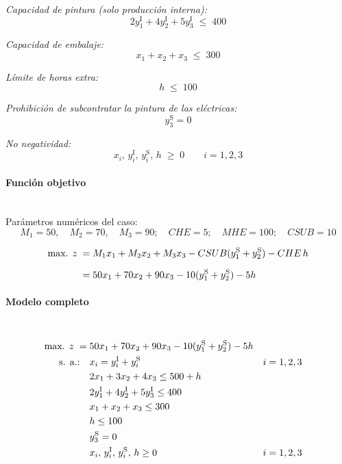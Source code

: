 \textit{Capacidad de pintura (solo producción interna):}
\begin{equation}
2y_1^{\mathrm{I}} + 4y_2^{\mathrm{I}} + 5y_3^{\mathrm{I}} \;\leq\; 400
\end{equation}

\textit{Capacidad de embalaje:}
\begin{equation}
x_1 + x_2 + x_3 \;\leq\; 300
\end{equation}

\textit{Límite de horas extra:}
\begin{equation}
h \;\leq\; 100
\end{equation}

\textit{Prohibición de subcontratar la pintura de las eléctricas:}
\begin{equation}
y_3^{\mathrm{S}} = 0
\end{equation}

\textit{No negatividad:}
\begin{equation}
x_i,\, y_i^{\mathrm{I}},\, y_i^{\mathrm{S}},\, h \;\geq\; 0 \qquad i=1,2,3
\end{equation}


\paragraph{Función objetivo}\mbox{}\\[-1mm]

Parámetros numéricos del caso:
\[
M_1 = 50,\quad M_2 = 70,\quad M_3 = 90;\quad
CHE = 5;\quad MHE = 100;\quad CSUB = 10
\]

\begin{align}
\mbox{max. } z \;=\;& 
M_1x_1 + M_2x_2 + M_3x_3 
- CSUB(y_1^{\mathrm{S}} + y_2^{\mathrm{S}})
- CHE\,h \notag\\[2mm]
=\;& 
50x_1 + 70x_2 + 90x_3 
- 10(y_1^{\mathrm{S}} + y_2^{\mathrm{S}}) 
- 5h
\end{align}


\paragraph{Modelo completo}\mbox{}\\[-1mm]

\begin{align}
\mbox{max. } z \;=\;& 
50x_1 + 70x_2 + 90x_3 
- 10(y_1^{\mathrm{S}} + y_2^{\mathrm{S}}) 
- 5h \notag\\
\mbox{s. a.:}\quad
& x_i = y_i^{\mathrm{I}} + y_i^{\mathrm{S}} && i=1,2,3 \notag\\
& 2x_1 + 3x_2 + 4x_3 \leq 500 + h \notag\\
& 2y_1^{\mathrm{I}} + 4y_2^{\mathrm{I}} + 5y_3^{\mathrm{I}} \leq 400 \notag\\
& x_1 + x_2 + x_3 \leq 300 \notag\\
& h \leq 100 \notag\\
& y_3^{\mathrm{S}} = 0 \notag\\
& x_i,\, y_i^{\mathrm{I}},\, y_i^{\mathrm{S}},\, h \geq 0 && i=1,2,3 \notag
\end{align}




